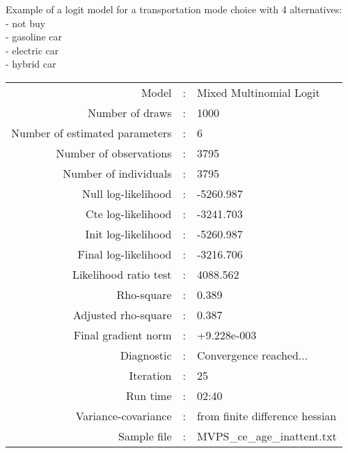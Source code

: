 Example of a logit model for a transportation mode choice with 4 alternatives:\\
- not buy\\
- gasoline car\\
- electric car\\
- hybrid car\\


\begin{flushleft}
\begin{tabular}{rcl}
\hline
Model &:& Mixed Multinomial Logit\\
Number of draws &:&1000\\
Number of estimated parameters&:&6\\
Number of  observations &:& 3795\\
Number of individuals&:&3795\\
Null log-likelihood&:&-5260.987\\
Cte log-likelihood&:&-3241.703\\
Init log-likelihood&:&-5260.987\\
Final log-likelihood&:&-3216.706\\
Likelihood ratio test &:&4088.562\\
Rho-square&:&0.389\\
Adjusted rho-square&:&0.387\\
Final gradient norm&:&+9.228e-003\\
Diagnostic&:&Convergence reached...\\
Iteration&:&25\\
Run time&:&02:40\\
Variance-covariance&:&from finite difference hessian\\
Sample file&:&MVPS_ce_age_inattent.txt\\
\end{tabular}
\end{flushleft}
